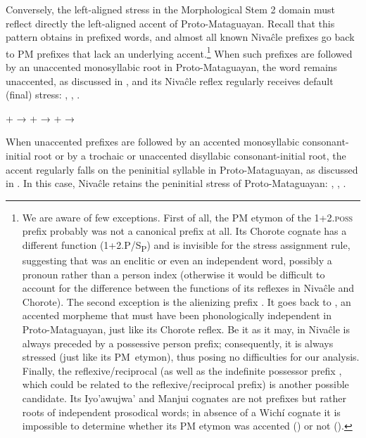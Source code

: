 Conversely, the left-aligned stress in the Morphological Stem 2 domain must reflect directly the left-aligned accent of Proto-Mataguayan. Recall that this pattern obtains in prefixed words, and almost all known Nivaĉle prefixes go back to PM prefixes that lack an underlying accent.\footnote{We are aware of few exceptions. First of all, the PM etymon of the 1+2.\textsc{poss} prefix  probably was not a canonical prefix at all. Its Chorote cognate has a different function (1+2.P/S\textsubscript{P}) and is invisible for the stress assignment rule, suggesting that  was an enclitic or even an independent word, possibly a pronoun rather than a person index (otherwise it would be difficult to account for the difference between the functions of its reflexes in Nivaĉle and Chorote). The second exception is the alienizing prefix . It goes back to , an accented morpheme that must have been phonologically independent in Proto-Mataguayan, just like its Chorote reflex. Be it as it may, in Nivaĉle  is always preceded by a possessive person prefix; consequently, it is always stressed (just like its PM~etymon), thus posing no difficulties for our analysis. Finally, the reflexive/reciprocal  (as well as the indefinite possessor prefix , which could be related to the reflexive/reciprocal prefix) is another possible candidate. Its Iyo’awujwa’ and Manjui cognates are not prefixes but rather roots of independent prosodical words; in absence of a Wichí cognate it is impossible to determine whether its PM etymon was accented () or not ().} When such prefixes are followed by an unaccented monosyllabic root in Proto-Mataguayan, the word remains unaccented, as discussed in , and its Nivaĉle reflex regularly receives default (final) stress: , , .

\ea
    \begin{xlist}
        \ex {} +  → 
        \ex {} +  → 
        \ex {} +  → 
    \end{xlist}
\z
{}

When unaccented prefixes are followed by an accented monosyllabic consonant-initial root or by a trochaic or unaccented disyllabic consonant-initial root, the accent regularly falls on the peninitial syllable in Proto-Mataguayan, as discussed in . In this case, Nivaĉle retains the peninitial stress of Proto-Mataguayan: , , .

